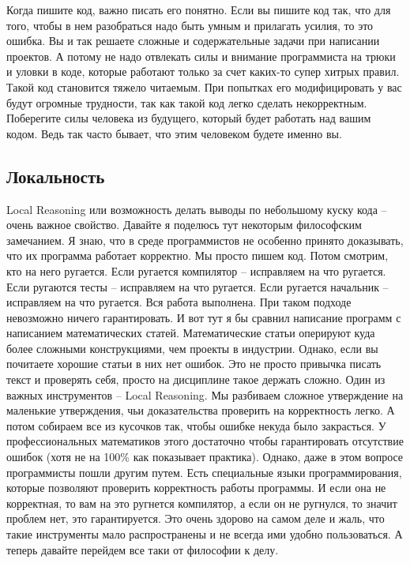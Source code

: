 Когда пишите код, важно писать его понятно.
Если вы пишите код так, что для того, чтобы в нем разобраться надо быть умным и прилагать усилия, то это ошибка.
Вы и так решаете сложные и содержательные задачи при написании проектов.
А потому не надо отвлекать силы и внимание программиста на трюки и уловки в коде, которые работают только за счет каких-то супер хитрых правил.
Такой код становится тяжело читаемым.
При попытках его модифицировать у вас будут огромные трудности, так как такой код легко сделать некорректным.
Поберегите силы человека из будущего, который будет работать над вашим кодом.
Ведь так часто бывает, что этим человеком будете именно вы.

\subsection{Локальность}
\label{section::Locality}

Local Reasoning или возможность делать выводы по небольшому куску кода -- очень важное свойство.
Давайте я поделюсь тут некоторым философским замечанием.
Я знаю, что в среде программистов не особенно принято доказывать, что их программа работает корректно.
Мы просто пишем код.
Потом смотрим, кто на него ругается.
Если ругается компилятор -- исправляем на что ругается.
Если ругаются тесты -- исправляем на что ругается.
Если ругается начальник -- исправляем на что ругается.
Вся работа выполнена.
При таком подходе невозможно ничего гарантировать.
И вот тут я бы сравнил написание программ с написанием математических статей.
Математические статьи оперируют куда более сложными конструкциями, чем проекты в индустрии.
Однако, если вы почитаете хорошие статьи в них нет ошибок.
Это не просто привычка писать текст и проверять себя, просто на дисциплине такое держать сложно.
Один из важных инструментов -- Local Reasoning.
Мы разбиваем сложное утверждение на маленькие утверждения, чьи доказательства проверить на корректность легко.
А потом собираем все из кусочков так, чтобы ошибке некуда было закрасться.
У профессиональных математиков этого достаточно чтобы гарантировать отсутствие ошибок (хотя не на 100\% как показывает практика).
Однако, даже в этом вопросе программисты пошли другим путем.
Есть специальные языки программирования, которые позволяют проверить корректность работы программы.
И если она не корректная, то вам на это ругнется компилятор, а если он не ругнулся, то значит проблем нет, это гарантируется.
Это очень здорово на самом деле и жаль, что такие инструменты мало распространены и не всегда ими удобно пользоваться.
А теперь давайте перейдем все таки от философии к делу.

